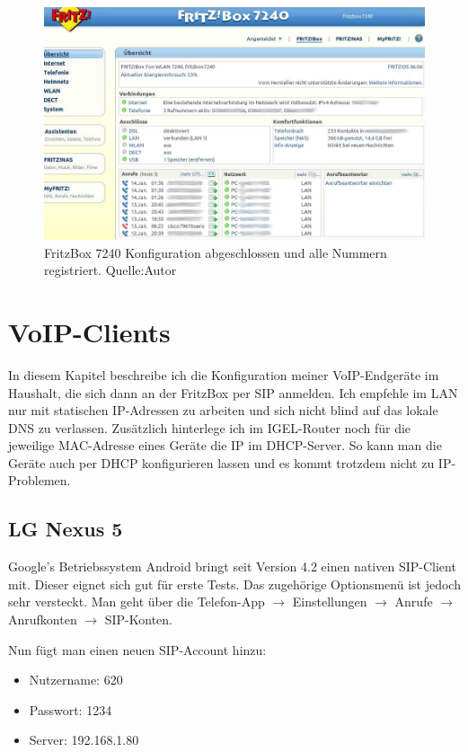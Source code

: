 \documentclass[a4paper,12pt]{scrbook}
\begin{document}
\begin{figure}[H]
\begin{center}
\includegraphics[width=1\hsize]{./images/voip-server-fritzbox-status.png}
\end{center}
\caption[FritzBox 7240 Konfiguration abgeschlossen und alle Nummern registriert.]
{\label{voip-server-fritzbox-status}FritzBox 7240 Konfiguration abgeschlossen und alle Nummern registriert. Quelle:Autor}
\end{figure}


\section{VoIP-Clients}
In diesem Kapitel beschreibe ich die Konfiguration meiner VoIP-Endgeräte im Haushalt, die sich dann an der FritzBox per SIP anmelden. Ich empfehle im LAN nur mit statischen
IP-Adressen zu arbeiten und sich nicht blind auf das lokale DNS zu verlassen. Zusätzlich hinterlege ich im IGEL-Router noch für die jeweilige MAC-Adresse eines Geräte die 
IP im DHCP-Server. So kann man die Geräte auch per DHCP konfigurieren lassen und es kommt trotzdem nicht zu IP-Problemen.

\subsection{LG Nexus 5}
Google's Betriebssystem Android bringt seit Version 4.2 einen nativen SIP-Client mit. Dieser eignet sich gut für erste Tests. Das zugehörige Optionsmenü ist jedoch sehr versteckt.
Man geht über die Telefon-App $\rightarrow$ Einstellungen $\rightarrow$ Anrufe $\rightarrow$ Anrufkonten $\rightarrow$ SIP-Konten.

Nun fügt man einen neuen SIP-Account hinzu:
\begin{itemize}
 \item Nutzername: 620
 \item Passwort: 1234
 \item Server: 192.168.1.80
\end{itemize}
\end{document}
